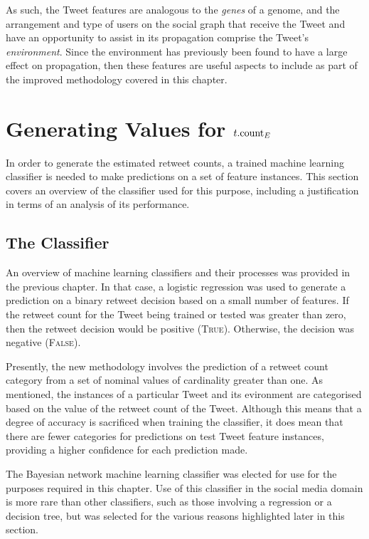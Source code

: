 As such, the Tweet features are analogous to the \textit{genes} of a genome, and the arrangement and type of users on the social graph that receive the Tweet and have an opportunity to assist in its propagation comprise the Tweet's \textit{environment}. Since the environment has previously been found to have a large effect on propagation, then these features are useful aspects to include as part of the improved methodology covered in this chapter.


\section{Generating Values for $t.\textrm{count}_E$}
In order to generate the estimated retweet counts, a trained machine learning classifier is needed to make predictions on a set of feature instances. This section covers an overview of the classifier used for this purpose, including a justification in terms of an analysis of its performance.


\subsection{The Classifier}
An overview of machine learning classifiers and their processes was provided in the previous chapter. In that case, a logistic regression was used to generate a prediction on a binary retweet decision based on a small number of features. If the retweet count for the Tweet being trained or tested was greater than zero, then the retweet decision would be positive (\textsc{True}). Otherwise, the decision was negative (\textsc{False}).

Presently, the new methodology involves the prediction of a retweet count category from a set of nominal values of cardinality greater than one. As mentioned, the instances of a particular Tweet and its evironment are categorised based on the value of the retweet count of the Tweet. Although this means that a degree of accuracy is sacrificed when training the classifier, it does mean that there are fewer categories for predictions on test Tweet feature instances, providing a higher confidence for each prediction made.

The Bayesian network machine learning classifier was elected for use for the purposes required in this chapter. Use of this classifier in the social media domain is more rare than other classifiers, such as those involving a regression or a decision tree, but was selected for the various reasons highlighted later in this section.

